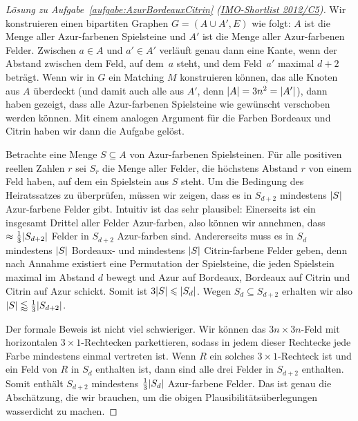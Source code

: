 \begin{proof}[Lösung zu Aufgabe~\ref{aufgabe:AzurBordeauxCitrin} \textmd{(\href{https://artofproblemsolving.com/community/c3963_2012_imo_shortlist}{IMO-Shortlist 2012/C5})}]
	Wir konstruieren einen bipartiten Graphen $G=(A\cup A',E)$ wie folgt: $A$ ist die Menge aller Azur-farbenen Spielsteine und $A'$ ist die Menge aller Azur-farbenen Felder. Zwischen $a\in A$ und $a'\in A'$ verläuft genau dann eine Kante, wenn der Abstand zwischen dem Feld, auf dem~$a$ steht, und dem Feld~$a'$ maximal $d+2$ beträgt. Wenn wir in $G$ ein Matching $M$ konstruieren können, das alle Knoten aus $A$ überdeckt (und damit auch alle aus $A'$, denn $\lvert A\rvert=3n^2=\lvert A'\rvert$), dann haben gezeigt, dass alle Azur-farbenen Spielsteine wie gewünscht verschoben werden können. Mit einem analogen Argument für die Farben Bordeaux und Citrin haben wir dann die Aufgabe gelöst.
	
	Betrachte eine Menge $S\subseteq A$ von Azur-farbenen Spielsteinen. Für alle positiven reellen Zahlen $r$ sei $S_r$ die Menge aller Felder, die höchstens Abstand $r$ von einem Feld haben, auf dem ein Spielstein aus $S$ steht. Um die Bedingung des Heiratssatzes zu überprüfen, müssen wir zeigen, dass es in $S_{d+2}$ mindestens $\lvert S\rvert$ Azur-farbene Felder gibt. Intuitiv ist das sehr plausibel: Einerseits ist ein insgesamt Drittel aller Felder Azur-farben, also können wir annehmen, dass $\approx\frac13\lvert S_{d+2}\rvert$ Felder in $S_{d+2}$ Azur-farben sind. Andererseits muss es in $S_d$ mindestens $\lvert S\rvert$ Bordeaux- und mindestens $\lvert S\rvert$ Citrin-farbene Felder geben, denn nach Annahme existiert eine Permutation der Spielsteine, die jeden Spielstein maximal im Abstand $d$ bewegt und Azur auf Bordeaux, Bordeaux auf Citrin und Citrin auf Azur schickt. Somit ist $3\lvert S\rvert\leqslant \lvert S_d\rvert$. Wegen $S_d\subseteq S_{d+2}$ erhalten wir also $\lvert S\rvert\lessapprox \frac13\lvert S_{d+2}\rvert$.
	
	Der formale Beweis ist nicht viel schwieriger. Wir können das $3n\times 3n$-Feld mit horizontalen $3\times 1$-Rechtecken parkettieren, sodass in jedem dieser Rechtecke jede Farbe mindestens einmal vertreten ist. Wenn $R$ ein solches $3\times 1$-Rechteck ist und ein Feld von $R$ in $S_d$ enthalten ist, dann sind alle drei Felder in $S_{d+2}$ enthalten. Somit enthält $S_{d+2}$ mindestens $\frac13\lvert S_d\rvert$ Azur-farbene Felder. Das ist genau die Abschätzung, die wir brauchen, um die obigen Plausibilitätsüberlegungen wasserdicht zu machen.
\end{proof}